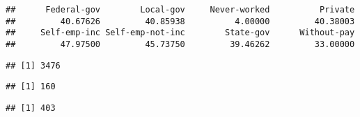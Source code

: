 \documentclass[12pt,]{article}
\newenvironment{Shaded}{\begin{snugshade}}{\end{snugshade}}
\newcommand{\CommentTok}[1]{\textcolor[rgb]{0.56,0.35,0.01}{\textit{#1}}}
\newcommand{\DecValTok}[1]{\textcolor[rgb]{0.00,0.00,0.81}{#1}}
\newcommand{\KeywordTok}[1]{\textcolor[rgb]{0.13,0.29,0.53}{\textbf{#1}}}
\newcommand{\NormalTok}[1]{#1}
\newcommand{\OperatorTok}[1]{\textcolor[rgb]{0.81,0.36,0.00}{\textbf{#1}}}
\newcommand{\StringTok}[1]{\textcolor[rgb]{0.31,0.60,0.02}{#1}}
\begin{document}
\begin{verbatim}
##      Federal-gov        Local-gov     Never-worked          Private 
##         40.67626         40.85938          4.00000         40.38003 
##     Self-emp-inc Self-emp-not-inc        State-gov      Without-pay 
##         47.97500         45.73750         39.46262         33.00000
\end{verbatim}

\begin{Shaded}
\end{Shaded}

\begin{verbatim}
## [1] 3476
\end{verbatim}

\begin{Shaded}
\end{Shaded}

\begin{verbatim}
## [1] 160
\end{verbatim}

\begin{Shaded}
\end{Shaded}

\begin{verbatim}
## [1] 403
\end{verbatim}
\end{document}
